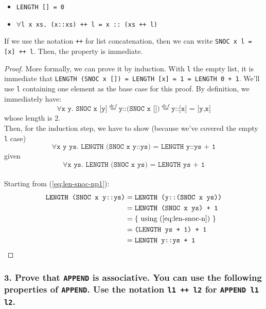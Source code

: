 \documentclass[10pt,a4paper]{article}
\newcommand{\eqdef}{\overset{def}{=}}
\begin{document}
\begin{itemize}
\item \texttt{LENGTH [] = 0}
\item \texttt{$\forall$l x xs.~(x::xs)~++~l = x~::~(xs~++~l)}
\end{itemize}

If we use the notation \texttt{++} for list concatenation, then we can write \texttt{SNOC x l = [x] ++ l}. Then, the property is immediate.

\begin{proof}
More formally, we can prove it by induction. With \texttt{l} the empty list, it is immediate that \texttt{LENGTH (SNOC x []) = LENGTH [x] = 1 = LENGTH 0 + 1}. We'll use \texttt{l} containing one element as the base case for this proof. By definition, we immediately have:
\begin{equation}
\forall \texttt{x y. SNOC x [y]} \eqdef \texttt{y::(SNOC x [])} \eqdef \texttt{y::[x] = [y,x]}
\end{equation}
whose length is 2.\\

Then, for the induction step, we have to show (because we've covered the empty \texttt{l} case)
\begin{equation}
\label{eq:len-snoc-np1}
\forall \texttt{x y ys. LENGTH (SNOC x y::ys) = LENGTH y::ys + 1}
\end{equation}
given
\begin{equation}
\label{eq:len-snoc-n}
\forall \texttt{x ys. LENGTH (SNOC x ys) = LENGTH ys + 1}
\end{equation}\\

Starting from (\ref{eq:len-snoc-np1}):
\begin{align*}
\texttt{LENGTH (SNOC x y::ys)}
&= \texttt{LENGTH (y::(SNOC x ys))} \\
&= \texttt{LENGTH (SNOC x ys) + 1} \\
&= \text{\{ using (\ref{eq:len-snoc-n}) \}} \\
&= \texttt{(LENGTH ys + 1) + 1} \\
&= \texttt{LENGTH y::ys + 1} \qedhere
\end{align*}
\end{proof}

\subsubsection*{3. Prove that \texttt{APPEND} is associative. You can use the following properties of \texttt{APPEND}. Use the notation \texttt{l1 ++ l2} for \texttt{APPEND l1 l2}.}
\end{document}
